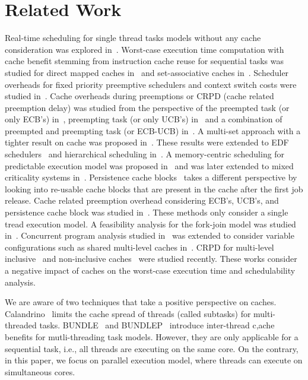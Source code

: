 \section{Related Work}\label{sec:related}
Real-time scheduling for single thread tasks models without any cache consideration was explored in~\cite{Liu:2000,Hennessey:2011 }. Worst-case execution time computation with cache benefit stemming from instruction cache reuse for sequential tasks was studied for direct mapped caches in~\cite{Arnold:1994, Mueller:1995,Mueller:2000} and set-associative caches in~\cite{Li:1996}. Scheduler overheads for fixed priority preemptive schedulers and context switch costs were studied in~\cite{burns:1993, katcher:1993}. Cache overheads during preemptions or CRPD (cache related preemption delay) was studied from the perspective of the preempted task (or only ECB's) in~\cite{Tomiyama:2000, tan:2007}, preempting task (or only UCB's) in~\cite{Lee:1998, altmeyer:2011, negi:2003} and a combination of preempted and preempting task (or ECB-UCB) in~\cite{staschulat:2005}. A multi-set approach with a tighter result on cache  was proposed in~\cite{altmeyer:2012}. These results were extended to EDF schedulers~\cite{ju:2007, lunniss:2014a, lunniss:2013} and hierarchical scheduling in~\cite{lunniss:2016, lunniss:2014b}. 
A memory-centric scheduling for predictable execution model was proposed in~\cite{Bak:2012, Pellizzoni:2011} and was later extended to mixed criticality systems in~\cite{Ward:2013}. Persistence cache blocks~\cite{Rashid:2016} takes a different perspective by looking into re-usable cache blocks that are present in the cache after the first job release. Cache related preemption overhead considering ECB's, UCB's, and persistence cache block was studied in~\cite{Rashid:2017}. 
These methods only consider a single tread execution model.  A  feasibility analysis for the fork-join model was studied in~\cite{Sun:2016}.   Concurrent program analysis studied in~\cite{Mittermayr:2012} was extended to consider variable configurations such as shared multi-level caches in~\cite{Li:2009}. CRPD for multi-level inclusive~\cite{zhang2016cache} and non-inclusive caches~\cite{chattopadhyay2014cache} were studied recently. These works consider a negative impact of caches on the worst-case execution time and schedulability analysis.


We are aware of two techniques that take a positive perspective on caches. Calandrino~\cite{Calandrino:2009} limits the cache spread of threads (called subtasks) for multi-threaded tasks. BUNDLE~\cite{tessler:2016} and BUNDLEP~\cite{tessler:2018} introduce inter-thread c,ache benefits for mutli-threading task models. However, they are only applicable for a sequential task, i.e., all threads are executing on the same core. On the contrary, in this paper, we focus on parallel execution model, where threads can execute on simultaneous cores.

